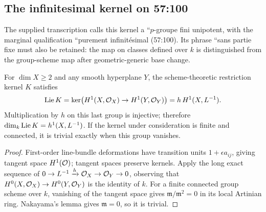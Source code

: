 \subsection{The infinitesimal kernel on 57:100}
The supplied transcription calls this kernel a ``$p$-groupe fini
unipotent, with the marginal qualification ``purement infinitésimal
(57:100). Its phrase ``sans partie fixe must also be retained: the
map on classes defined over $k$ is distinguished from the group-scheme
map after geometric-generic base change.
\begin{proposition}\label{a:tangent}
For $\dim X\geq2$ and any smooth hyperplane $Y$, the scheme-theoretic
restriction kernel $K$ satisfies
\[
 \operatorname{Lie} K=\ker\bigl(H^1(X,\mathcal O_X)\to H^1(Y,\mathcal O_Y)\bigr)
        =h\,H^1(X,L^{-1}).
\]
Multiplication by $h$ on this last group is injective; therefore
$\dim_k\operatorname{Lie} K=h^1(X,L^{-1})$.  If the kernel under consideration is
finite and connected, it is trivial exactly when this group vanishes.
\end{proposition}
\begin{proof}
First-order line-bundle deformations have transition units
$1+\epsilon a_{ij}$, giving tangent space $H^1(\mathcal O)$; tangent spaces
preserve kernels.  Apply the long exact sequence of
$0\to L^{-1}\xrightarrow{h}\mathcal O_X\to\mathcal O_Y\to0$, observing that
$H^0(X,\mathcal O_X)\to H^0(Y,\mathcal O_Y)$ is the identity of $k$.
For a finite connected group scheme over $k$, vanishing of the tangent
space gives $\mathfrak m/\mathfrak m^2=0$ in its local Artinian ring.
Nakayama's lemma gives $\mathfrak m=0$, so it is trivial.
\end{proof}

